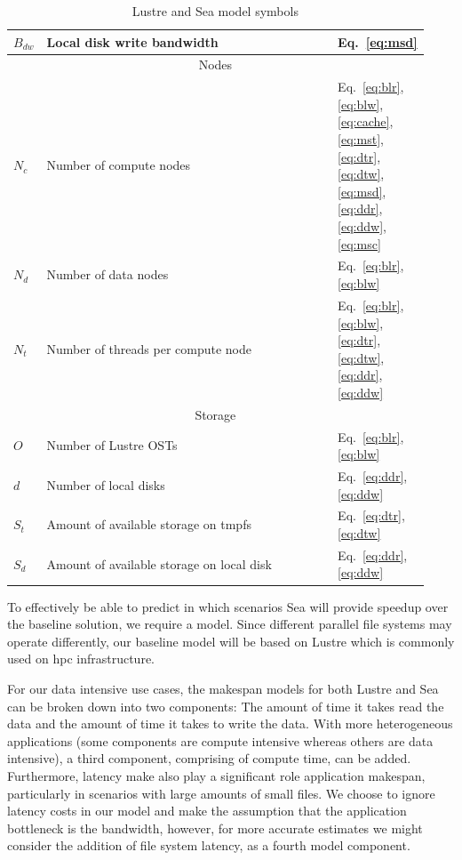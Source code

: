 \documentclass{report}
\begin{document}
\begin{table}
\begin{tabular}{|p{0.03\linewidth}|p{0.7\linewidth}|p{0.2\linewidth}|}
     $B_{dw}$ & Local disk write bandwidth & Eq.~\ref{eq:msd}\\
     \hline
     \multicolumn{3}{|c|}{Nodes} \\
     \hline
     $N_{c}$ & Number of compute nodes & Eq.~\ref{eq:blr}, \ref{eq:blw}, \ref{eq:cache}, \ref{eq:mst}, \ref{eq:dtr}, \ref{eq:dtw}, \ref{eq:msd}, \ref{eq:ddr}, \ref{eq:ddw}, \ref{eq:msc}\\
     $N_{d}$ & Number of data nodes & Eq.~\ref{eq:blr}, \ref{eq:blw}\\
     $N_{t}$ & Number of threads per compute node & Eq.~\ref{eq:blr}, \ref{eq:blw}, \ref{eq:dtr}, \ref{eq:dtw}, \ref{eq:ddr}, \ref{eq:ddw}\\
     \hline
     \multicolumn{3}{|c|}{Storage} \\
     \hline
     $O$ & Number of Lustre OSTs & Eq.~\ref{eq:blr}, \ref{eq:blw}\\
     $d$ & Number of local disks & Eq.~\ref{eq:ddr}, \ref{eq:ddw}\\
     $S_{t}$ & Amount of available storage on tmpfs & Eq.~\ref{eq:dtr}, \ref{eq:dtw} \\
     $S_{d}$ & Amount of available storage on local disk & Eq.~\ref{eq:ddr}, \ref{eq:ddw} \\
     \hline
    \end{tabular}
    \caption{Lustre and Sea model symbols}
    \label{table:1}
    \end{table}

    To effectively be able to predict in which scenarios Sea will provide speedup
    over the baseline solution, we require a model. Since different parallel file
    systems may operate differently, our baseline model will be based on Lustre which
    is commonly used on \gls{hpc} infrastructure.

    For our data intensive use cases, the makespan models for both Lustre and Sea can be broken
    down into two components: The amount of time it takes read the data and the amount
    of time it takes to write the data. With more heterogeneous applications (some components 
    are compute intensive whereas others are data intensive), a third component, comprising
    of compute time, can be added. Furthermore, latency make also play a significant role
    application makespan, particularly in scenarios with large amounts of small files.
    We choose to ignore latency costs in our model and make the assumption that the
    application bottleneck is the bandwidth, however, for more accurate estimates we
    might consider the addition of file system latency, as a fourth model component.
\end{document}
